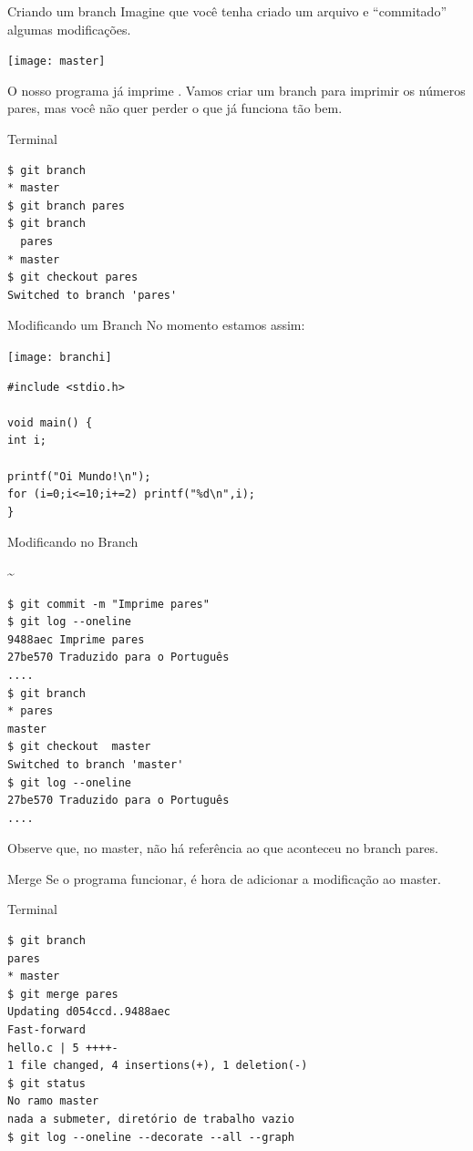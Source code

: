 \begin{frame}[fragile]{Criando um branch}
Imagine que você tenha criado um arquivo e “commitado” algumas modificações. 
\begin{center}
	\texttt{[image: master]}
\end{center}
O nosso programa já imprime .
Vamos criar um branch para imprimir os números pares, mas você não quer perder o que já funciona tão bem.  
\begin{terminal}{Terminal}
\begin{Verbatim}[fontseries=b]
$ git branch
* master
$ git branch pares
$ git branch
  pares
* master
$ git checkout pares
Switched to branch 'pares'
\end{Verbatim} 
\end{terminal}
\end{frame}

\begin{frame}[fragile]{Modificando um Branch}
No momento estamos assim:
\begin{center}
		\texttt{[image: branchi]}
\end{center}

\begin{lstlisting}[style=cstyle]
#include <stdio.h>

void main() {
int i;

printf("Oi Mundo!\n");	
for (i=0;i<=10;i+=2) printf("%d\n",i);
}

\end{lstlisting}
\end{frame}

\begin{frame}[fragile]{Modificando no Branch}
\begin{terminal}{\~}
\begin{Verbatim}[fontseries=b]
$ git commit -m "Imprime pares"
$ git log --oneline
9488aec Imprime pares
27be570 Traduzido para o Português
.... 
$ git branch
* pares
master
$ git checkout  master
Switched to branch 'master'
$ git log --oneline
27be570 Traduzido para o Português
....
\end{Verbatim}
Observe que, no master, não há referência ao que aconteceu no branch pares. 
\end{terminal}	
\end{frame}
%
\begin{frame}[fragile]{Merge}
Se o programa funcionar, é hora de adicionar a modificação ao master.
\begin{terminal}{Terminal}
\begin{Verbatim}[fontseries=b]
$ git branch
pares
* master 
$ git merge pares
Updating d054ccd..9488aec
Fast-forward
hello.c | 5 ++++-
1 file changed, 4 insertions(+), 1 deletion(-)
$ git status
No ramo master
nada a submeter, diretório de trabalho vazio
$ git log --oneline --decorate --all --graph 
\end{Verbatim} 
\end{terminal}	
\end{frame}

